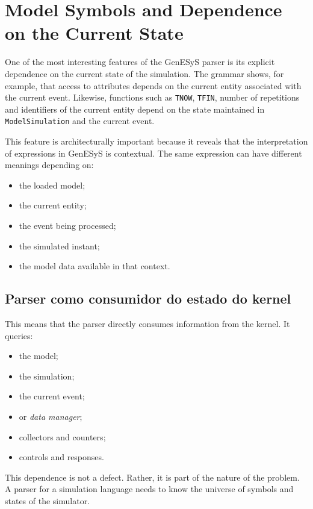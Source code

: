 \section{Model Symbols and Dependence on the Current State}
\label{sec:cap9_simbolos_modelo_estado_corrente}

One of the most interesting features of the GenESyS parser is its explicit dependence on the current state of the simulation. The grammar shows, for example, that access to attributes depends on the current entity associated with the current event. Likewise, functions such as \texttt{TNOW}, \texttt{TFIN}, number of repetitions and identifiers of the current entity depend on the state maintained in \texttt{ModelSimulation} and the current event.

This feature is architecturally important because it reveals that the interpretation of expressions in GenESyS is contextual. The same expression can have different meanings depending on:
\begin{itemize}
 \item the loaded model;
 \item the current entity;
 \item the event being processed;
 \item the simulated instant;
 \item the model data available in that context.
\end{itemize}

\subsection{Parser como consumidor do estado do kernel}
\label{subsec:cap9_parser_consumidor_estado_kernel}

This means that the parser directly consumes information from the kernel. It queries:
\begin{itemize}
 \item the model;
 \item the simulation;
 \item the current event;
 \item or \textit{data manager};
 \item collectors and counters;
 \item controls and responses.
\end{itemize}

This dependence is not a defect. Rather, it is part of the nature of the problem. A parser for a simulation language needs to know the universe of symbols and states of the simulator.

